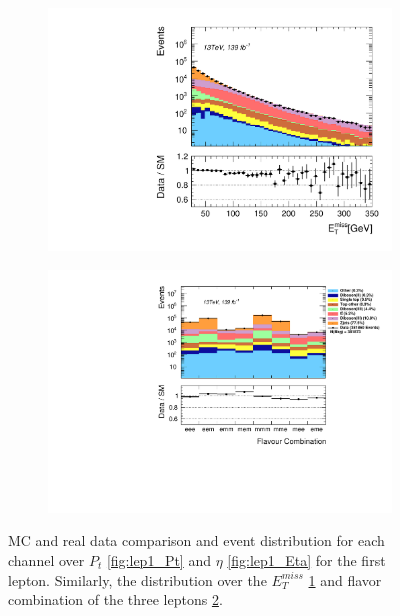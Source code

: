 \begin{figure}
{\begin{subfigure}{.405\textwidth}
        \includegraphics[width=\textwidth]{Figures/FeaturesHistograms/met_Et.pdf}
        \vspace{-0.75cm}
        \caption{}
        \label{fig:met_Et}
    \end{subfigure}
    \hfill
    \begin{subfigure}{.525\textwidth}
        \includegraphics[width=\textwidth]{Figures/FeaturesHistograms/flcomp.pdf}
        \vspace{-0.75cm}
        \caption{}
        \label{fig:flcomp}
    \end{subfigure}
    }
    \caption[\acs{MC} simulated and measured data comparison and event distribution for each channel for the $p_T$ and $\eta$ of the leading lepton 
    as well as the $E_T^{miss}$ and flavor combination from each event.]{\ac{MC} and real data comparison and event distribution for each channel over $P_t$ \ref{fig:lep1_Pt} and 
    $\eta$ \ref{fig:lep1_Eta} for the first lepton. Similarly, the distribution over the $E_T^{miss}$ \ref{fig:met_Et}
    and flavor combination of the three leptons \ref{fig:flcomp}.}
    \label{fig:Dist1}
\end{figure}